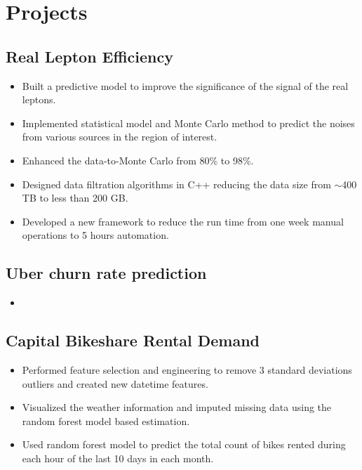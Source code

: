 \documentclass[11pt, letterpaper]{yt_resume}   	%
\begin{document}

\section{Projects}

\subsection{Real Lepton Efficiency}{}{}{}{}
\begin{itemize}
\item Built a predictive model to improve the significance of the signal of the real leptons.
\item Implemented statistical model and Monte Carlo method to predict the noises from various sources in the region of interest.
\item Enhanced the data-to-Monte Carlo from 80\% to 98\%.
\item Designed data filtration algorithms in C++ reducing the data size from $\sim$400 TB to less than 200 GB.
\item Developed a new framework to reduce the run time from one week manual operations to 5 hours automation.
\end{itemize}

\subsection{Uber churn rate prediction}{}{}{}{}
\begin{itemize}
\item
\end{itemize}

\subsection{Capital Bikeshare Rental Demand}{}{}{}{}
\begin{itemize}
\item Performed feature selection and engineering to remove 3 standard deviations outliers and created new datetime features.
\item Visualized the weather information and imputed missing data using the random forest model based estimation.
\item Used random forest model to predict the total count of bikes rented during each hour of the last 10 days in each month.
\end{itemize}
\end{document}
